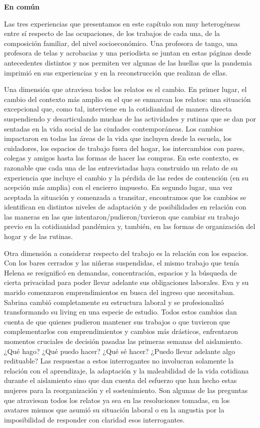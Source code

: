 \textbf{En común}

Las tres experiencias que presentamos en este capítulo son muy heterogéneas entre sí respecto de las ocupaciones, de los trabajos de cada una, de la composición familiar, del nivel socioeconómico. Una profesora de tango, una profesora de telas y acrobacias y una periodista se juntan en estas páginas desde antecedentes distintos y nos permiten ver algunas de las huellas que la pandemia imprimió en sus experiencias y en la reconstrucción que realizan de ellas.

Una dimensión que atraviesa todos los relatos es el cambio. En primer lugar, el cambio del contexto más amplio en el que se enmarcan los relatos: una situación excepcional que, como tal, interviene en la cotidianidad de manera directa suspendiendo y desarticulando muchas de las actividades y rutinas que se dan por sentadas en la vida social de las ciudades contemporáneas. Los cambios impactaron en todas las áreas de la vida que incluyen desde la escuela, los cuidadores, los espacios de trabajo fuera del hogar, los intercambios con pares, colegas y amigos hasta las formas de hacer las compras. En este contexto, es razonable que cada una de las entrevistadas haya construido un relato de su experiencia que incluye el cambio y la pérdida de las redes de contención (en su acepción más amplia) con el encierro impuesto. En segundo lugar, una vez aceptada la situación y comenzada a transitar, encontramos que los cambios se identifican en distintos niveles de adaptación y de posibilidades en relación con las maneras en las que intentaron/pudieron/tuvieron que cambiar su trabajo previo en la cotidianidad pandémica y, también, en las formas de organización del hogar y de las rutinas.

Otra dimensión a considerar respecto del trabajo es la relación con los espacios. Con los bares cerrados y las niñeras suspendidas, el mismo trabajo que tenía Helena se resignificó en demandas, concentración, espacios y la búsqueda de cierta privacidad para poder llevar adelante sus obligaciones laborales. Eva y su marido comenzaron emprendimientos en busca del ingreso que necesitaban. Sabrina cambió completamente su estructura laboral y se profesionalizó transformando su living en una especie de estudio. Todos estos cambios dan cuenta de que quienes pudieron mantener sus trabajos o que tuvieron que complementarlos con emprendimientos y cambios más drásticos, enfrentaron momentos cruciales de decisión pasadas las primeras semanas del aislamiento. ¿Qué hago? ¿Qué puedo hacer? ¿Qué sé hacer? ¿Puedo llevar adelante algo redituable? Las respuestas a estos interrogantes no involucran solamente la relación con el aprendizaje, la adaptación y la maleabilidad de la vida cotidiana durante el aislamiento sino que dan cuenta del esfuerzo que han hecho estas mujeres para la reorganización y el sostenimiento. Son algunas de las preguntas que atraviesan todos los relatos ya sea en las resoluciones tomadas, en los avatares mismos que asumió su situación laboral o en la angustia por la imposibilidad de responder con claridad esos interrogantes.

